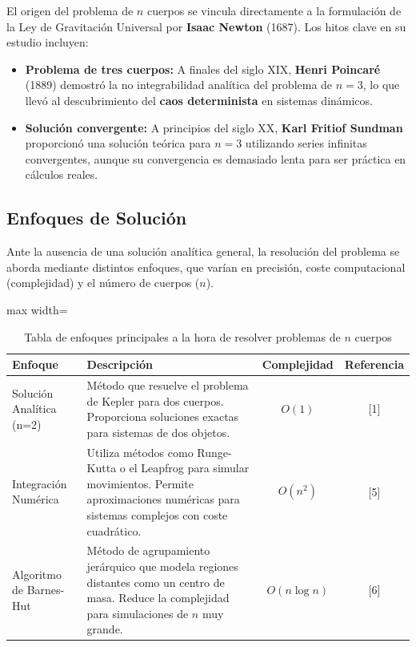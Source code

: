 El origen del problema de $n$ cuerpos se vincula directamente a la formulación de la Ley de Gravitación Universal por \textbf{Isaac Newton} (1687). Los hitos clave en su estudio incluyen:
\begin{itemize}
    \item \textbf{Problema de tres cuerpos:} A finales del siglo XIX, \textbf{Henri Poincaré} (1889) demostró la no integrabilidad analítica del problema de $n=3$, lo que llevó al descubrimiento del \textbf{caos determinista} en sistemas dinámicos.
    \item \textbf{Solución convergente:} A principios del siglo XX, \textbf{Karl Fritiof Sundman} proporcionó una solución teórica para $n=3$ utilizando series infinitas convergentes, aunque su convergencia es demasiado lenta para ser práctica en cálculos reales.
\end{itemize}

\subsection{Enfoques de Solución}
\label{subsec:enfoques_solucion}

Ante la ausencia de una solución analítica general, la resolución del problema se aborda mediante distintos enfoques, que varían en precisión, coste computacional (complejidad) y el número de cuerpos ($n$).


\begin{table}[H]
    \centering
    \caption[Enfoques en $n$ cuerpos]{\small Tabla de enfoques principales a la hora de resolver problemas de $n$ cuerpos}
    \label{tab:EnfoquesNCuerpos}
    \begin{adjustbox}{max width=\linewidth}
        \begin{tabular}{@{}p{}p{}cc@{}}
            \toprule
            \textbf{Enfoque} & \textbf{Descripción} & \textbf{Complejidad} & \textbf{Referencia} \\
            \midrule
            Solución Analítica (n=2) &
            Método que resuelve el problema de Kepler para dos cuerpos.
            Proporciona soluciones exactas para sistemas de dos objetos. &
            $O(1)$ & [1] \\
            \midrule
            Integración Numérica &
            Utiliza métodos como Runge-Kutta o el Leapfrog para simular movimientos.
            Permite aproximaciones numéricas para sistemas complejos con coste cuadrático. &
            $O(n^2)$ & [5] \\
            \midrule
            Algoritmo de Barnes-Hut &
            Método de agrupamiento jerárquico que modela regiones distantes como un centro de masa.
            Reduce la complejidad para simulaciones de $n$ muy grande. &
            $O(n \log n)$ & [6] \\
            \bottomrule
        \end{tabular}
    \end{adjustbox}
\end{table}

